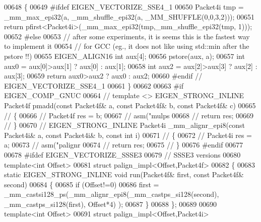 \begin{DoxyCode}
00648 \{
00649 \textcolor{preprocessor}{#ifdef EIGEN\_VECTORIZE\_SSE4\_1}
00650   Packet4i tmp = \_mm\_max\_epi32(a, \_mm\_shuffle\_epi32(a, \_MM\_SHUFFLE(0,0,3,2)));
00651   \textcolor{keywordflow}{return} pfirst<Packet4i>(\_mm\_max\_epi32(tmp,\_mm\_shuffle\_epi32(tmp, 1)));
00652 \textcolor{preprocessor}{#else}
00653   \textcolor{comment}{// after some experiments, it is seems this is the fastest way to implement it}
00654   \textcolor{comment}{// for GCC (eg., it does not like using std::min after the pstore !!)}
00655   EIGEN\_ALIGN16 \textcolor{keywordtype}{int} aux[4];
00656   pstore(aux, a);
00657   \textcolor{keywordtype}{int} aux0 = aux[0]>aux[1] ? aux[0] : aux[1];
00658   \textcolor{keywordtype}{int} aux2 = aux[2]>aux[3] ? aux[2] : aux[3];
00659   \textcolor{keywordflow}{return} aux0>aux2 ? aux0 : aux2;
00660 \textcolor{preprocessor}{#endif // EIGEN\_VECTORIZE\_SSE4\_1}
00661 \}
00662 
00663 \textcolor{preprocessor}{#if EIGEN\_COMP\_GNUC}
00664 \textcolor{comment}{// template <> EIGEN\_STRONG\_INLINE Packet4f pmadd(const Packet4f&  a, const Packet4f&  b, const Packet4f& 
       c)}
00665 \textcolor{comment}{// \{}
00666 \textcolor{comment}{//   Packet4f res = b;}
00667 \textcolor{comment}{//   asm("mulps %
00668 \textcolor{comment}{//   return res;}
00669 \textcolor{comment}{// \}}
00670 \textcolor{comment}{// EIGEN\_STRONG\_INLINE Packet4i \_mm\_alignr\_epi8(const Packet4i&  a, const Packet4i&  b, const int i)}
00671 \textcolor{comment}{// \{}
00672 \textcolor{comment}{//   Packet4i res = a;}
00673 \textcolor{comment}{//   asm("palignr %
00674 \textcolor{comment}{//   return res;}
00675 \textcolor{comment}{// \}}
00676 \textcolor{preprocessor}{#endif}
00677 
00678 \textcolor{preprocessor}{#ifdef EIGEN\_VECTORIZE\_SSSE3}
00679 \textcolor{comment}{// SSSE3 versions}
00680 \textcolor{keyword}{template}<\textcolor{keywordtype}{int} Offset>
00681 \textcolor{keyword}{struct }palign\_impl<Offset,Packet4f>
00682 \{
00683   \textcolor{keyword}{static} EIGEN\_STRONG\_INLINE \textcolor{keywordtype}{void} run(Packet4f& first, \textcolor{keyword}{const} Packet4f& second)
00684   \{
00685     \textcolor{keywordflow}{if} (Offset!=0)
00686       first = \_mm\_castsi128\_ps(\_mm\_alignr\_epi8(\_mm\_castps\_si128(second), \_mm\_castps\_si128(first), Offset*4)
      );
00687   \}
00688 \};
00689 
00690 \textcolor{keyword}{template}<\textcolor{keywordtype}{int} Offset>
00691 \textcolor{keyword}{struct }palign\_impl<Offset,Packet4i>
}}
\end{DoxyCode}
